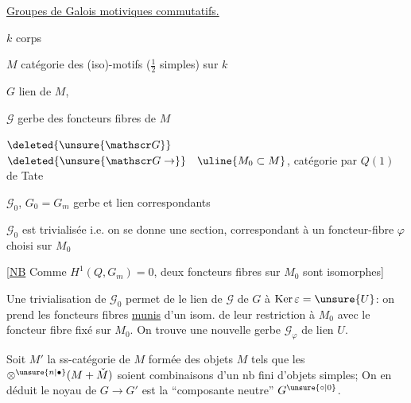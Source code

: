 \uline{Groupes de Galois motiviques commutatifs.}

$k$ corps

$M$ catégorie des (iso)-motifs ($\frac12$ simples) sur $k$

$G$ lien de $M$, 

$\mathscr G$ gerbe des  foncteurs fibres de $M$

$\deleted{\unsure{\mathscr G}}$
$\deleted{\unsure{\mathscr G\to}}\quad\uline{M_0\subset M}$, catégorie   par $Q(1)$ de Tate

$\mathscr G_0$, $G_0=G_m$ gerbe et lien correspondants

$\mathscr G_0$ est trivialisée i.e. on se donne une section, correspondant à un foncteur-fibre $\varphi$  choisi sur $M_0$

[\uline{NB} Comme $H^1(Q,G_m)=0$, deux foncteurs fibres sur $M_0$ sont  isomorphes]

Une trivialisation de $\mathscr G_0$ permet de \uline{} le lien de $\mathscr G$ de $G$ à $\operatorname{Ker}\varepsilon=\unsure{U}$: on prend les foncteurs fibres \uline{munis} d'un isom. de leur restriction à $M_0$ avec le foncteur fibre fixé sur $M_0$. On trouve une nouvelle gerbe $\mathscr G_\varphi$ de lien $U$.

Soit $M'$ la ss-catégorie de $M$ formée des objets $M$ tels que les $\otimes^{\unsure{n|\bullet}}(M+\check M)$ soient combinaisons d'un nb fini d'objets simples;  On en déduit
le noyau de $G\to G'$ est la ``composante neutre'' $G^{\unsure{\circ|0}}$.

